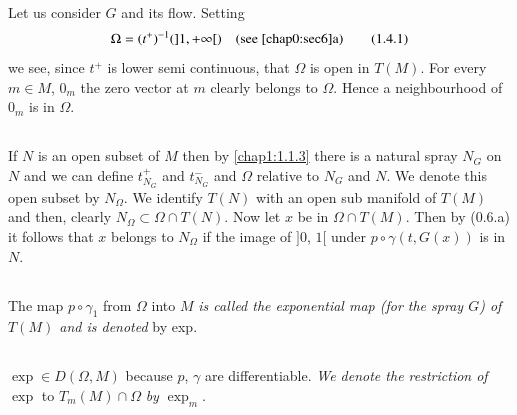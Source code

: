 Let us consider $G$ and its flow. Setting
\begin{equation*}\label{chap1:1.4.1}
\Omega=(t^{+})^{-1}(]1, +\infty[)\quad \text{(see \ref{chap0:sec6}a)} \tag{1.4.1}
\end{equation*}
we see, since $t^{+}$ is lower semi continuous, that $\Omega$ is open
in $T(M)$. For every $m\in M$, $0_{m}$ the zero vector at $m$ clearly
belongs to $\Omega$. Hence a neighbourhood of $0_{m}$ is in $\Omega$.

\setcounter{subsection}{1}
\subsection{}\label{chap1:1.4.2}

If $N$ is an open subset of $M$ then by \ref{chap1:1.1.3} there is a
natural spray $N_{G}$ on $N$ and we can define $t^{+}_{N_{G}}$ and
$t^{-}_{N_{G}}$ and $\Omega$ relative to $N_{G}$ and $N$. We denote
this open subset by $N_{\Omega}$. We identify $T(N)$ with an open
sub manifold of $T(M)$ and then, clearly $N_{\Omega}\subset \Omega\cap
T(N)$. Now let $x$ be in $\Omega\cap T(M)$. Then by (0.6.a) it follows
that $x$ belongs to $N_{\Omega}$ if the image of $]0$, $1[$ under
    $p\circ \gamma(t,G(x))$ is in $N$.

\setcounter{subsection}{2}
\subsection{}\label{chap1:1.4.3}

\begin{defi*}
The map $p\circ \gamma_{1}$ from $\Omega$ into $M$ {\em is called the
  exponential map (for the spray $G$) of $T(M)$ and is denoted} by exp.
\end{defi*}

\setcounter{subsection}{3}
\subsection{}\label{chap1:1.4.4}

\begin{note*}
$\exp\in D(\Omega,M)$ because $p$, $\gamma$ are differentiable. {\em
    We denote the restriction of $\exp$} to $T_{m}(M)\cap \Omega$ {\em
    by} $\exp_{m}$.
\end{note*}

\subsection{}\label{chap1:1.4.5}

